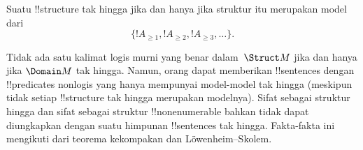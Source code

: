 \documentclass[../../../include/open-logic-section]{subfiles}
\begin{document}
\begin{prop}
Suatu !!{structure} tak hingga jika dan hanya jika struktur itu merupakan
model dari
\[
\{!A_{\ge 1}, !A_{\ge 2}, !A_{\ge 3}, \dots \}.
\]
\end{prop}

Tidak ada satu kalimat logis murni yang benar dalam~$\Struct M$ jika dan hanya
jika $\Domain M$ tak hingga. Namun, orang dapat memberikan !!{sentence}s
dengan !!{predicate}s nonlogis yang hanya mempunyai model-model tak hingga
(meskipun tidak setiap !!{structure} tak hingga merupakan modelnya). Sifat
sebagai struktur hingga dan sifat sebagai struktur !!{nonenumerable} bahkan
tidak dapat diungkapkan dengan suatu himpunan !!{sentence}s tak hingga.
Fakta-fakta ini mengikuti dari teorema kekompakan dan
L\"owenheim--Skolem.
\end{document}
